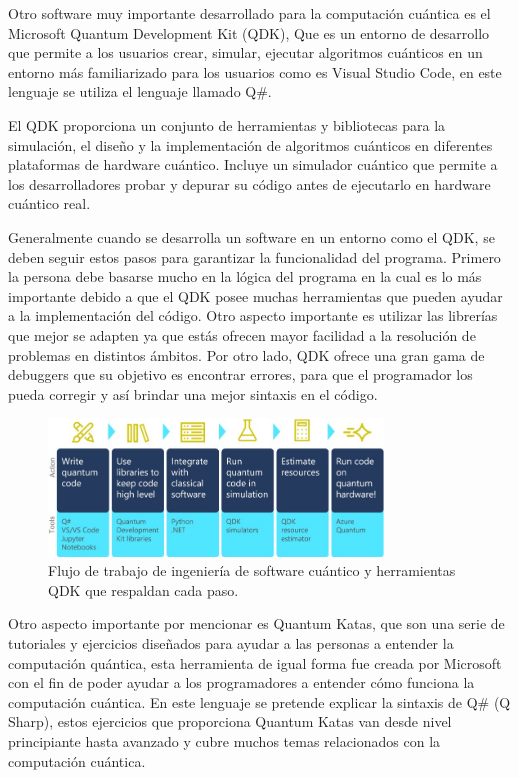 \documentclass{article}
\begin{document}
Otro software muy importante desarrollado para la computación cuántica es el Microsoft Quantum Development Kit (QDK), Que es un entorno de desarrollo que permite a los usuarios crear, simular, ejecutar algoritmos cuánticos en un entorno más familiarizado para los usuarios como es Visual Studio Code, en este lenguaje se utiliza el lenguaje llamado Q\#.  

El QDK proporciona un conjunto de herramientas y bibliotecas para la simulación, el diseño y la implementación de algoritmos cuánticos en diferentes plataformas de hardware cuántico. Incluye un simulador cuántico que permite a los desarrolladores probar y depurar su código antes de ejecutarlo en hardware cuántico real. 

Generalmente cuando se desarrolla un software en un entorno como el QDK, se deben seguir estos pasos para garantizar la funcionalidad del programa. Primero la persona debe basarse mucho en la lógica del programa en la cual es lo más importante debido a que el QDK posee muchas herramientas que pueden ayudar a la implementación del código. Otro aspecto importante es utilizar las librerías que mejor se adapten ya que estás ofrecen mayor facilidad a la resolución de problemas en distintos ámbitos. Por otro lado, QDK ofrece una gran gama de debuggers que su objetivo es encontrar errores, para que el programador los pueda corregir y así brindar una mejor sintaxis en el código.  


\begin{figure}[htb]
    \centering
    \includegraphics[width=3.5in]{QDK.jpg}
    \caption{Flujo de trabajo de ingeniería de software cuántico y herramientas QDK que respaldan cada paso.}
    \label{fig:quantum}
\end{figure}

Otro aspecto importante por mencionar es Quantum Katas, que son una serie de tutoriales y ejercicios diseñados para ayudar a las personas a entender la computación quántica, esta herramienta de igual forma fue creada por Microsoft con el fin de poder ayudar a los programadores a entender cómo funciona la computación cuántica. En este lenguaje se pretende explicar la sintaxis de Q\# (Q Sharp), estos ejercicios que proporciona Quantum Katas van desde nivel principiante hasta avanzado y cubre muchos temas relacionados con la computación cuántica. 
\end{document}

